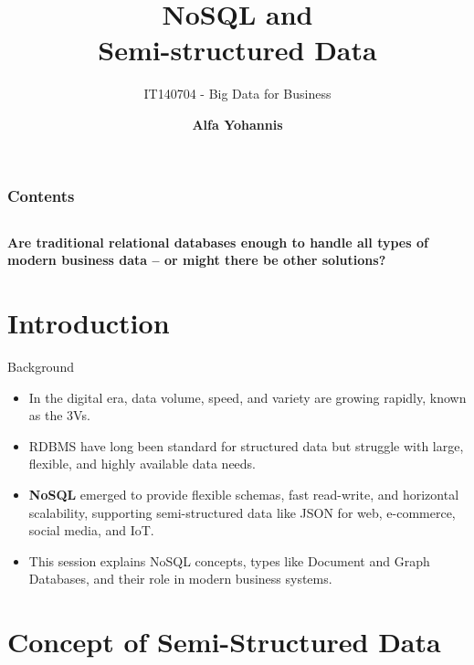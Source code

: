 \documentclass[aspectratio=169, table]{beamer}
\title{\Huge NoSQL and \\
\vspace{10pt}
Semi-structured Data}
\subtitle{IT140704 - Big Data for Business}
\author{\textbf{Alfa Yohannis}}
\begin{document}
\frame{\titlepage}


\begin{frame}[fragile]
\frametitle{Contents}
\vspace{20pt}
\begin{columns}[t]
	\tableofcontents[sections={1-4}]
	
	\tableofcontents[sections={5-20}]
\end{columns}
\end{frame}


\begin{frame}{\hfill}
	\centering
	\Huge{\textbf{Are traditional relational databases enough to handle all types of modern business data – or might there be other solutions?}}
\end{frame}


\section{Introduction}

\begin{frame}{Background}
	\vspace{20pt}
	
	\begin{itemize}
		\item In the digital era, data volume, speed, and variety are growing rapidly, known as the 3Vs.
		
		\item RDBMS have long been standard for structured data but struggle with large, flexible, and highly available data needs.
		
		\item \textbf{NoSQL} emerged to provide flexible schemas, fast read-write, and horizontal scalability, supporting semi-structured data like JSON for web, e-commerce, social media, and IoT.
		
		\item This session explains NoSQL concepts, types like Document and Graph Databases, and their role in modern business systems.
	\end{itemize}
	
\end{frame}


\section{Concept of Semi-Structured Data}
\end{document}
